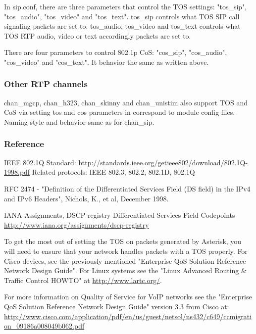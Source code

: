 In sip.conf, there are three parameters that control the TOS settings:
"tos\_sip", "tos\_audio", "tos\_video" and "tos\_text". tos\_sip controls
what TOS SIP call signaling packets are set to. tos\_audio, tos\_video
and tos\_text controls what TOS RTP audio, video or text accordingly
packets are set to.

There are four parameters to control 802.1p CoS: "cos\_sip", "cos\_audio",
"cos\_video" and "cos\_text". It behavior the same as written above.

\subsubsection{Other RTP channels}

chan\_mgcp, chan\_h323, chan\_skinny and chan\_unistim also support TOS and
CoS via setting tos and cos parameters in correspond to module config 
files. Naming style and behavior same as for chan\_sip.

\subsubsection{Reference}

IEEE 802.1Q Standard:
\url{http://standards.ieee.org/getieee802/download/802.1Q-1998.pdf}
Related protocols: IEEE 802.3, 802.2, 802.1D, 802.1Q

RFC 2474 - "Definition of the Differentiated Services Field
(DS field) in the IPv4 and IPv6 Headers", Nichols, K., et al,
December 1998.

IANA Assignments, DSCP registry
Differentiated Services Field Codepoints
\url{http://www.iana.org/assignments/dscp-registry}

To get the most out of setting the TOS on packets generated by
Asterisk, you will need to ensure that your network handles packets
with a TOS properly.  For Cisco devices, see the previously mentioned
"Enterprise QoS Solution Reference Network Design Guide".  For Linux
systems see the "Linux Advanced Routing \& Traffic Control HOWTO" at 
\url{http://www.lartc.org/}.

For more information on Quality of
Service for VoIP networks see the "Enterprise QoS Solution Reference
Network Design Guide" version 3.3 from Cisco at:
\url{http://www.cisco.com/application/pdf/en/us/guest/netsol/ns432/c649/ccmigration\_09186a008049b062.pdf}
